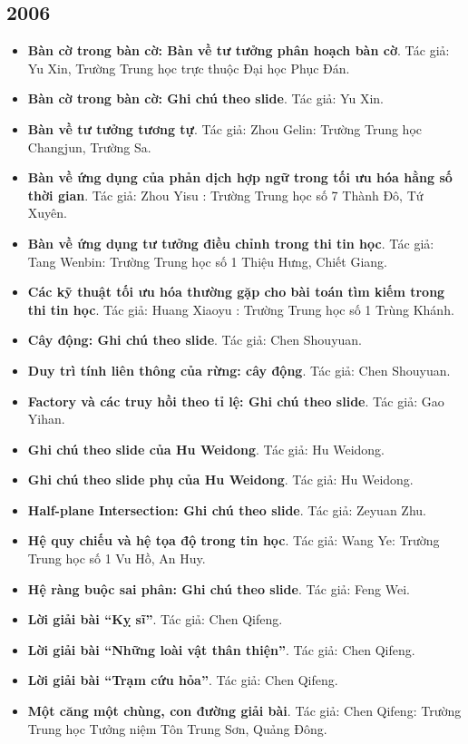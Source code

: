 \documentclass[11pt]{article}
\begin{document}
\subsection{2006}
\begin{itemize}[leftmargin=2em]
  \item \textbf{Bàn cờ trong bàn cờ: Bàn về tư tưởng phân hoạch bàn cờ}. Tác giả: Yu Xin, Trường Trung học trực thuộc Đại học Phục Đán.
  \item \textbf{Bàn cờ trong bàn cờ: Ghi chú theo slide}. Tác giả: Yu Xin.
  \item \textbf{Bàn về tư tưởng tương tự}. Tác giả: Zhou Gelin: Trường Trung học Changjun, Trường Sa.
  \item \textbf{Bàn về ứng dụng của phản dịch hợp ngữ trong tối ưu hóa hằng số thời gian}. Tác giả: Zhou Yisu : Trường Trung học số 7 Thành Đô, Tứ Xuyên.
  \item \textbf{Bàn về ứng dụng tư tưởng điều chỉnh trong thi tin học}. Tác giả: Tang Wenbin: Trường Trung học số 1 Thiệu Hưng, Chiết Giang.
  \item \textbf{Các kỹ thuật tối ưu hóa thường gặp cho bài toán tìm kiếm trong thi tin học}. Tác giả: Huang Xiaoyu : Trường Trung học số 1 Trùng Khánh.
  \item \textbf{Cây động: Ghi chú theo slide}. Tác giả: Chen Shouyuan.
  \item \textbf{Duy trì tính liên thông của rừng: cây động}. Tác giả: Chen Shouyuan.
  \item \textbf{Factory và các truy hồi theo tỉ lệ: Ghi chú theo slide}. Tác giả: Gao Yihan.
  \item \textbf{Ghi chú theo slide của Hu Weidong}. Tác giả: Hu Weidong.
  \item \textbf{Ghi chú theo slide phụ của Hu Weidong}. Tác giả: Hu Weidong.
  \item \textbf{Half-plane Intersection: Ghi chú theo slide}. Tác giả: Zeyuan Zhu.
  \item \textbf{Hệ quy chiếu và hệ tọa độ trong tin học}. Tác giả: Wang Ye: Trường Trung học số 1 Vu Hồ, An Huy.
  \item \textbf{Hệ ràng buộc sai phân: Ghi chú theo slide}. Tác giả: Feng Wei.
  \item \textbf{Lời giải bài ``Kỵ sĩ''}. Tác giả: Chen Qifeng.
  \item \textbf{Lời giải bài ``Những loài vật thân thiện''}. Tác giả: Chen Qifeng.
  \item \textbf{Lời giải bài ``Trạm cứu hỏa''}. Tác giả: Chen Qifeng.
  \item \textbf{Một căng một chùng, con đường giải bài}. Tác giả: Chen Qifeng: Trường Trung học Tưởng niệm Tôn Trung Sơn, Quảng Đông.

\end{itemize}
\end{document}
